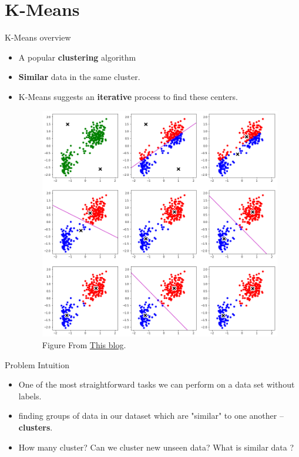 \documentclass[serif, aspectratio=169]{beamer}
\begin{document}
\section{K-Means}
\begin{frame}{K-Means overview}
    \begin{itemize}
        \item   A popular \textbf{clustering} algorithm
        \item \textbf{Similar} data in the same cluster.
        \item K-Means suggests an \textbf{iterative} process to find these centers.
        \begin{figure}
        \centering
        \includegraphics[scale=0.25]{pic/figs/Clustering_K-means_7_1.png}
        Figure From \href{https://mlbhanuyerra.github.io/2018-02-19-Clustering-K-means/}{This blog}.
    \end{figure}
    \end{itemize}
\end{frame}

\begin{frame}{Problem Intuition}
    \begin{itemize}
    
        \item One of the most straightforward tasks we can perform on a data set without labels.
        \item finding groups of data in our dataset which are "similar" to one another --\textbf{clusters}.
        \item How many cluster? Can we cluster new unseen data? What is similar data ?
        
    \end{itemize}
\end{frame}
\end{document}
